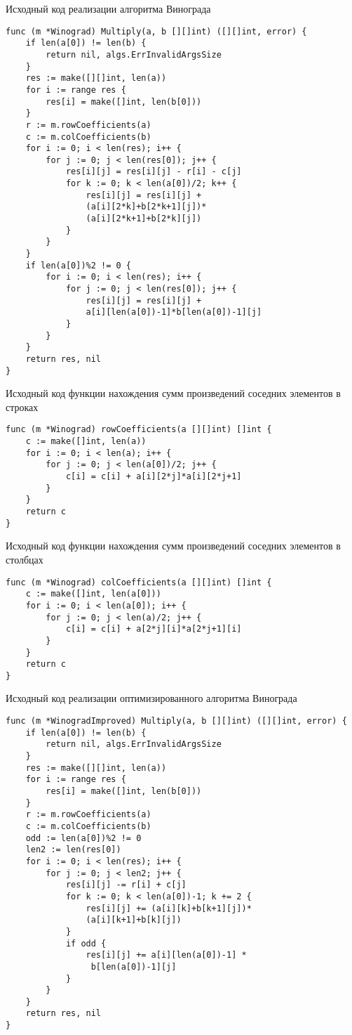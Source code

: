 \newpage

\begin{code}
\caption{Исходный код реализации алгоритма Винограда}
\begin{verbatim}
func (m *Winograd) Multiply(a, b [][]int) ([][]int, error) {
	if len(a[0]) != len(b) {
		return nil, algs.ErrInvalidArgsSize
	}
	res := make([][]int, len(a))
	for i := range res {
		res[i] = make([]int, len(b[0]))
	}
	r := m.rowCoefficients(a)
	c := m.colCoefficients(b)
	for i := 0; i < len(res); i++ {
		for j := 0; j < len(res[0]); j++ {
			res[i][j] = res[i][j] - r[i] - c[j]
			for k := 0; k < len(a[0])/2; k++ {
				res[i][j] = res[i][j] + 
				(a[i][2*k]+b[2*k+1][j])*
				(a[i][2*k+1]+b[2*k][j])
			}
		}
	}
	if len(a[0])%2 != 0 {
		for i := 0; i < len(res); i++ {
			for j := 0; j < len(res[0]); j++ {
				res[i][j] = res[i][j] + 
				a[i][len(a[0])-1]*b[len(a[0])-1][j]
			}
		}
	}
	return res, nil
}
\end{verbatim}
\end{code}

\newpage

\begin{code}
\caption{Исходный код функции нахождения сумм произведений соседних элементов в строках}
\begin{verbatim}
func (m *Winograd) rowCoefficients(a [][]int) []int {
	c := make([]int, len(a))
	for i := 0; i < len(a); i++ {
		for j := 0; j < len(a[0])/2; j++ {
			c[i] = c[i] + a[i][2*j]*a[i][2*j+1]
		}
	}
	return c
}
\end{verbatim}
\end{code}

\begin{code}
\caption{Исходный код функции нахождения сумм произведений соседних элементов в столбцах}
\begin{verbatim}
func (m *Winograd) colCoefficients(a [][]int) []int {
	c := make([]int, len(a[0]))
	for i := 0; i < len(a[0]); i++ {
		for j := 0; j < len(a)/2; j++ {
			c[i] = c[i] + a[2*j][i]*a[2*j+1][i]
		}
	}
	return c
}
\end{verbatim}
\end{code}

\newpage

\begin{code}
\caption{Исходный код реализации оптимизированного алгоритма Винограда}
\begin{verbatim}
func (m *WinogradImproved) Multiply(a, b [][]int) ([][]int, error) {
	if len(a[0]) != len(b) {
		return nil, algs.ErrInvalidArgsSize
	}
	res := make([][]int, len(a))
	for i := range res {
		res[i] = make([]int, len(b[0]))
	}
	r := m.rowCoefficients(a)
	c := m.colCoefficients(b)
	odd := len(a[0])%2 != 0
	len2 := len(res[0])
	for i := 0; i < len(res); i++ {
		for j := 0; j < len2; j++ {
			res[i][j] -= r[i] + c[j]
			for k := 0; k < len(a[0])-1; k += 2 {
				res[i][j] += (a[i][k]+b[k+1][j])*
				(a[i][k+1]+b[k][j])
			}
			if odd {
				res[i][j] += a[i][len(a[0])-1] *
				 b[len(a[0])-1][j]
			}
		}
	}
	return res, nil
}
\end{verbatim}
\end{code}

